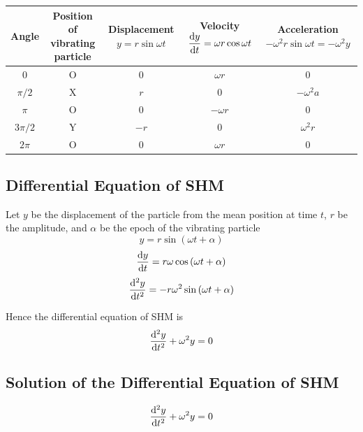 \documentclass[12pt]{article}
\begin{document}
\vspace{20pt}
\begin{center}
    \begin{tabular}{c | c | c | c | c}
        Angle & \makecell{Position of \\ vibrating particle} & \makecell{Displacement \\ $y = r \sin{\omega t}$} & \makecell{Velocity \\ $\displaystyle \dv{y}{t} = \omega r \cos{\omega t}$} & \makecell{Acceleration \\ $-\omega^2 r \sin{\omega t} = -\omega^2 y$} \\\hline\hline
        0 & O & 0 & $\omega r$ & 0 \\\hline
        $\pi/2$ & X & $r$ & 0 & $-\omega^2 a$ \\\hline
        $\pi$ & O & 0 & $-\omega r$ & 0 \\\hline
        $3\pi/2$ & Y & $-r$ & 0 & $\omega^2 r$ \\\hline
        $2\pi$ & O & 0 & $\omega r$ & 0
    \end{tabular}
\end{center}

\subsection{Differential Equation of SHM}
Let $y$ be the displacement of the particle from the mean position at time $t$, $r$ be the amplitude, and $\alpha$ be the epoch of the vibrating particle \\
\begin{equation}
    y = r \sin{(\omega t + \alpha)}
\end{equation}
\begin{equation}
    \dv{y}{t} = r \omega \cos{(\omega t + \alpha)}
\end{equation}
\begin{equation}
    \dv[2]{y}{t} = -r \omega^2 \sin{(\omega t + \alpha)}
\end{equation}

Hence the differential equation of SHM is
\begin{equation}
    \dv[2]{y}{t} + \omega^2 y = 0
\end{equation}

\subsection{Solution of the Differential Equation of SHM}
\begin{equation}
    \dv[2]{y}{t} + \omega^2 y = 0
\end{equation}
\end{document}
